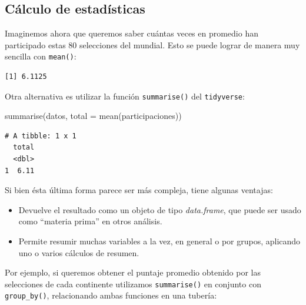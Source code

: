 \documentclass[
]{book}
\newenvironment{Shaded}{\begin{snugshade}}{\end{snugshade}}
\newcommand{\AttributeTok}[1]{\textcolor[rgb]{0.77,0.63,0.00}{#1}}
\newcommand{\FunctionTok}[1]{\textcolor[rgb]{0.00,0.00,0.00}{#1}}
\newcommand{\NormalTok}[1]{#1}
\newcommand{\SpecialCharTok}[1]{\textcolor[rgb]{0.00,0.00,0.00}{#1}}
\providecommand{\tightlist}{%
  \setlength{\itemsep}{0pt}\setlength{\parskip}{0pt}}
\begin{document}
\hypertarget{cuxe1lculo-de-estaduxedsticas}{%
\subsection{Cálculo de estadísticas}\label{cuxe1lculo-de-estaduxedsticas}}

Imaginemos ahora que queremos saber cuántas veces en promedio han participado estas 80 selecciones del mundial. Esto se puede lograr de manera muy sencilla con \texttt{mean()}:

\begin{Shaded}
\end{Shaded}

\begin{verbatim}
[1] 6.1125
\end{verbatim}

Otra alternativa es utilizar la función \texttt{summarise()} del \texttt{tidyverse}:

\begin{Shaded}
\begin{Highlighting}[]
\FunctionTok{summarise}\NormalTok{(datos, }\AttributeTok{total =} \FunctionTok{mean}\NormalTok{(participaciones))}
\end{Highlighting}
\end{Shaded}

\begin{verbatim}
# A tibble: 1 x 1
  total
  <dbl>
1  6.11
\end{verbatim}

Si bien ésta última forma parece ser más compleja, tiene algunas ventajas:

\begin{itemize}
\tightlist
\item
  Devuelve el resultado como un objeto de tipo \emph{data.frame}, que puede ser usado como ``materia prima'' en otros análisis.
\item
  Permite resumir muchas variables a la vez, en general o por grupos, aplicando uno o varios cálculos de resumen.
\end{itemize}

Por ejemplo, si queremos obtener el puntaje promedio obtenido por las selecciones de cada continente utilizamos \texttt{summarise()} en conjunto con \texttt{group\_by()}, relacionando ambas funciones en una tubería:
\end{document}

